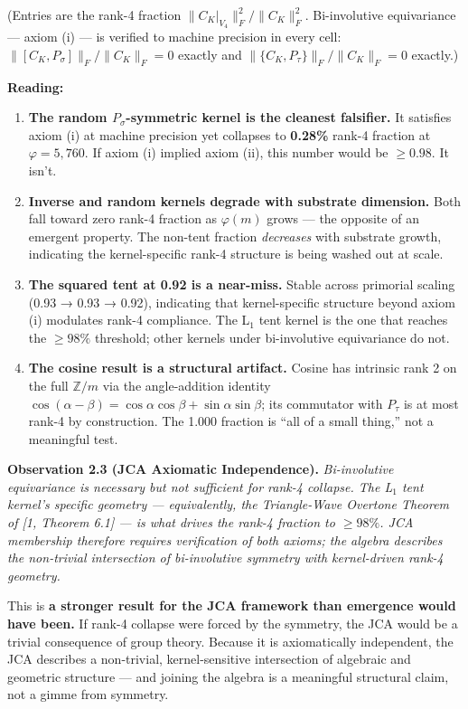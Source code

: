 \documentclass[
]{article}
\providecommand{\tightlist}{%
  \setlength{\itemsep}{0pt}\setlength{\parskip}{0pt}}
\begin{document}
(Entries are the rank-4 fraction \(\|C_K|_{V_4}\|_F^2 / \|C_K\|_F^2\).
Bi-involutive equivariance --- axiom (i) --- is verified to machine
precision in every cell: \(\|[C_K, P_\sigma]\|_F / \|C_K\|_F = 0\)
exactly and \(\|\{C_K, P_\tau\}\|_F / \|C_K\|_F = 0\) exactly.)

\textbf{Reading:}

\begin{enumerate}
\def\labelenumi{\arabic{enumi}.}
\tightlist
\item
  \textbf{The random \(P_\sigma\)-symmetric kernel is the cleanest
  falsifier.} It satisfies axiom (i) at machine precision yet collapses
  to \textbf{0.28\%} rank-4 fraction at \(\varphi = 5{,}760\). If axiom
  (i) implied axiom (ii), this number would be \(\geq 0.98\). It isn't.
\item
  \textbf{Inverse and random kernels degrade with substrate dimension.}
  Both fall toward zero rank-4 fraction as \(\varphi(m)\) grows --- the
  opposite of an emergent property. The non-tent fraction
  \emph{decreases} with substrate growth, indicating the kernel-specific
  rank-4 structure is being washed out at scale.
\item
  \textbf{The squared tent at 0.92 is a near-miss.} Stable across
  primorial scaling (0.93 → 0.93 → 0.92), indicating that
  kernel-specific structure beyond axiom (i) modulates rank-4
  compliance. The L\(_1\) tent kernel is the one that reaches the
  \(\geq 98\%\) threshold; other kernels under bi-involutive
  equivariance do not.
\item
  \textbf{The cosine result is a structural artifact.} Cosine has
  intrinsic rank 2 on the full \(\mathbb{Z}/m\) via the angle-addition
  identity
  \(\cos(\alpha-\beta) = \cos\alpha\cos\beta + \sin\alpha\sin\beta\);
  its commutator with \(P_\tau\) is at most rank-4 by construction. The
  1.000 fraction is ``all of a small thing,'' not a meaningful test.
\end{enumerate}

\textbf{Observation 2.3 (JCA Axiomatic Independence).}
\emph{Bi-involutive equivariance is necessary but not sufficient for
rank-4 collapse. The L\(_1\) tent kernel's specific geometry ---
equivalently, the Triangle-Wave Overtone Theorem of {[}1, Theorem 6.1{]}
--- is what drives the rank-4 fraction to \(\geq 98\%\). JCA membership
therefore requires verification of both axioms; the algebra describes
the non-trivial intersection of bi-involutive symmetry with
kernel-driven rank-4 geometry.}

This is \textbf{a stronger result for the JCA framework than emergence
would have been.} If rank-4 collapse were forced by the symmetry, the
JCA would be a trivial consequence of group theory. Because it is
axiomatically independent, the JCA describes a non-trivial,
kernel-sensitive intersection of algebraic and geometric structure ---
and joining the algebra is a meaningful structural claim, not a gimme
from symmetry.
\end{document}
